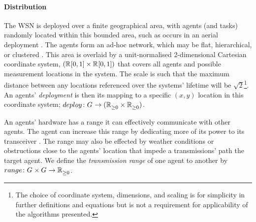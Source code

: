 \paragraph{Distribution}
\label{section:task_and_resources:distribution}
\newcommand{\formalDeployment}[2]{\functionFormal{deploy}{\setAgents{}{}}{(\setRealNumbersNonNegative{}{} \times \setRealNumbersNonNegative{}{})}}

\newcommand{\functionDeployment}[2]{
	\functionSignature{deploy}{\varAgent{#1}{#2}}
}

\newcommand{\formalTransmissionRange}[2]{
	\functionFormal{range}
	{\setAgents{}{} \times \setAgents{}{}}
	{\setRealNumbersNonNegative{}{}}
}
\newcommand{\functionTransmissionRange}[2]{\functionSignature{range}{\varAgent{#1}{}, varAgent{#2}{}}}

The WSN is deployed over a finite geographical area, with agents (and tasks) randomly located within this bounded area, such as occurs in an aerial deployment \citep{Kumar2013}.  The agents form an ad-hoc network, which may be flat, hierarchical, or clustered \citep{Carlos-Mancilla2016b}. This area is overlaid by a unit-normalised 2-dimensional Cartesian coordinate system,  $(\mathbb{R}_{}^{}[0,1] \times \mathbb{R}_{}^{}[0,1])$ that covers all agents and possible measurement locations in the system. The scale is such that the maximum distance between any locations referenced over the systems' lifetime will be $\sqrt{2}$\footnote{The choice of coordinate system, dimensions, and scaling is for simplicity in further definitions and equations but is not a requirement for applicability of the algorithms presented.}. An agents' \textit{deployment} is then its mapping to a specific $(x, y)$ location in this coordinate system; $\formalDeployment{}{}$.

An agents' hardware has a range it can effectively communicate with other agents. The agent can increase this range by dedicating more of its power to its transceiver \citep{Padmanabh2008, Song2009, Radman2010}. The range may also be effected by weather conditions or obstructions close to the agents' location that impede a transmissions' path the target agent. We define the \textit{transmission range} of one agent to another by $\formalTransmissionRange{}{}$.  

